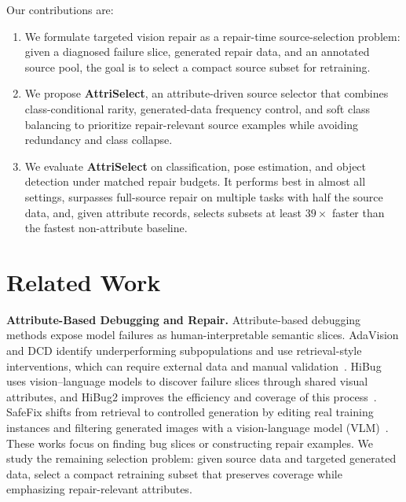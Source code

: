 \documentclass[10pt,twocolumn,letterpaper]{article}
\newcommand{\modelname}{AttriSelect}
\newcommand{\model}{\textcolor{darkteal}{\textbf{\modelname}}\xspace}
\newcommand{\hibug}{HiBug\xspace}
\begin{document}
Our contributions are:
\begin{enumerate}[nosep,leftmargin=*,itemsep=1pt,topsep=0pt]
\item We formulate targeted vision repair as a repair-time source-selection problem: given a diagnosed failure slice, generated repair data, and an annotated source pool, the goal is to select a compact source subset for retraining.
\item We propose \model, an attribute-driven source selector that combines class-conditional rarity, generated-data frequency control, and soft class balancing to prioritize repair-relevant source examples while avoiding redundancy and class collapse.
\item We evaluate \model on classification, pose estimation, and object detection under matched repair budgets. It performs best in almost all settings, surpasses full-source repair on multiple tasks with half the source data, and, given attribute records, selects subsets at least $39\times$ faster than the fastest non-attribute baseline.
\end{enumerate}

\section{Related Work}



\noindent\textbf{Attribute-Based Debugging and Repair.} Attribute-based debugging methods expose model failures as human-interpretable semantic slices. AdaVision and DCD identify underperforming subpopulations and use retrieval-style interventions, which can require external data and manual validation~\citep{gao2023adaptive,singla2024data}. \hibug uses vision--language models to discover failure slices through shared visual attributes, and HiBug2 improves the efficiency and coverage of this process~\citep{chen2023hibug,chen2025hibug2}. SafeFix shifts from retrieval to controlled generation by editing real training instances and filtering generated images with a vision-language model (VLM)~\citep{xu2025safefix}. These works focus on finding bug slices or constructing repair examples. We study the remaining selection problem: given source data and targeted generated data, select a compact retraining subset that preserves coverage while emphasizing repair-relevant attributes.
\end{document}
